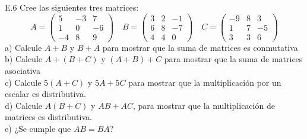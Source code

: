 \documentclass[12pt,letterpaper]{article}
\begin{document}
E.6 Cree las siguientes tres matrices:
$$
    A = \begin{pmatrix}
        5 & -3 & 7 \\
        1 & 0 & -6 \\
        -4 & 8 & 9
    \end{pmatrix}\quad
    B = \begin{pmatrix}
        3 & 2 & -1 \\
        6 & 8 & -7 \\
        4 & 4 & 0
    \end{pmatrix}\quad
    C = \begin{pmatrix}
        -9 & 8 & 3 \\
        1 & 7 & -5 \\
        3 & 3 & 6
    \end{pmatrix}
$$
a) Calcule $A+B$ y $B+A$ para mostrar que la suma de matrices es conmutativa\\
b) Calcule $A+(B+C)$ y $(A+B)+C$ para mostrar que la suma de matrices asociativa\\
c) Calcule $5(A+C)$ y $5A+5C$ para mostrar que la multiplicación por un escalar es distributiva.\\
d) Calcule $A(B+C)$ y $AB+AC$, para mostrar que la multiplicación de matrices es distributiva.\\
e) ¿Se cumple que $AB = BA$?
\end{document}
